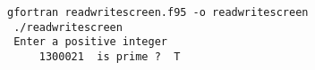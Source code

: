 \begin{Verbatim}[frame=lines,label=readwritescreen - commands and output]
 gfortran readwritescreen.f95 -o readwritescreen
 ./readwritescreen
 Enter a positive integer
     1300021  is prime ?  T
\end{Verbatim}
